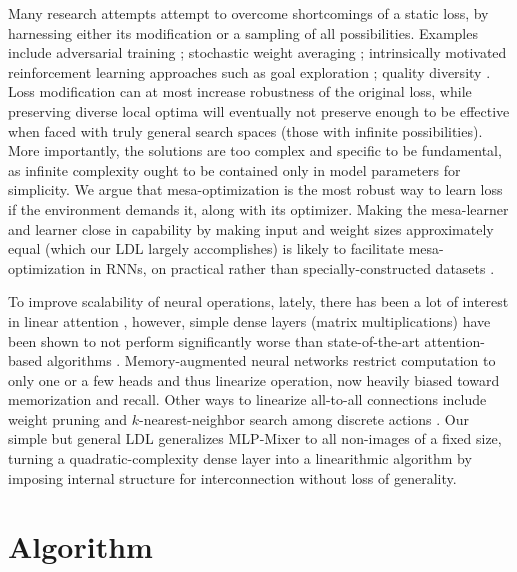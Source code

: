 \documentclass{article}
\begin{document}
Many research attempts attempt to overcome shortcomings of a static loss, by harnessing either its modification or a sampling of all possibilities. Examples include adversarial training \cite{du2021understanding} \cite{goodfellow2015explaining}; stochastic weight averaging \cite{izmailov2019averaging}; intrinsically motivated reinforcement learning approaches \cite{6294131} such as goal exploration \cite{DBLP:journals/corr/abs-1708-02190}; quality diversity \cite{Gravina_2019} \cite{meyerson2017discovering} \cite{parkerholder2020effective}. Loss modification can at most increase robustness of the original loss, while preserving diverse local optima will eventually not preserve enough to be effective when faced with truly general search spaces (those with infinite possibilities). More importantly, the solutions are too complex and specific to be fundamental, as infinite complexity ought to be contained only in model parameters for simplicity. We argue that mesa-optimization \cite{hubinger2019risks} is the most robust way to learn loss if the environment demands it, along with its optimizer. Making the mesa-learner and learner close in capability by making input and weight sizes approximately equal (which our LDL largely accomplishes) is likely to facilitate mesa-optimization in RNNs, on practical rather than specially-constructed datasets \cite{Ravi2017OptimizationAA}.

To improve scalability of neural operations, lately, there has been a lot of interest in linear attention \cite{schlag2021linear}, however, simple dense layers (matrix multiplications) have been shown to not perform significantly worse than state-of-the-art attention-based algorithms \cite{tolstikhin2021mlpmixer}. Memory-augmented neural networks \cite{collier2019memoryaugmented} restrict computation to only one or a few heads and thus linearize operation, now heavily biased toward memorization and recall. Other ways to linearize all-to-all connections include weight pruning \cite{zhou2021effective} and $k$-nearest-neighbor search among discrete actions \cite{DBLP:journals/corr/Dulac-ArnoldESC15}. Our simple but general LDL generalizes MLP-Mixer \cite{tolstikhin2021mlpmixer} to all non-images of a fixed size, turning a quadratic-complexity dense layer into a linearithmic algorithm by imposing internal structure for interconnection without loss of generality.

\section{Algorithm\label{Algorithm}}
\end{document}
